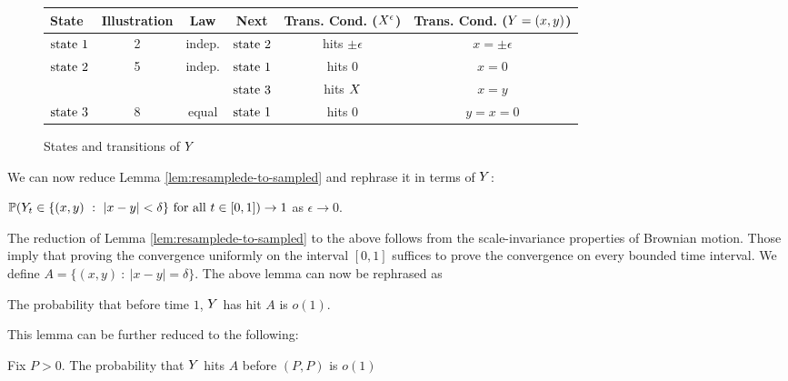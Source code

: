 {\begin{figure}\label{fig:twodimtranstab}
\begin{center}
  \begin{tabular}{| l || c | c | c | c | c | }
    \hline
    State & Illustration & Law & Next & Trans. Cond. ($X^{\epsilon}$) & Trans. Cond. ($Y=(x,y)$) \\
    \hline
    \hline
    $\text{state }1$ & 2 & indep. & $\text{state }2$ & hits $\pm\epsilon$ & $x=\pm\epsilon$ \\
    \hline
    \multirow{2}{*}{$\text{state }2$} & \multirow{2}{*}{5} & \multirow{2}{*}{indep.} & $\text{state }1$ & hits $0$ & $x=0$ \\ \cline{4-6}
        &  &  & $\text{state }3$ & hits $X$ & $x=y$\\
    \hline
    $\text{state }3$  & 8 & equal & $\text{state }1$ &  hits $0$ & $y=x=0$\\
    \hline
  \end{tabular}
\end{center}
\caption{States and transitions of $Y$}
\end{figure}

We can now reduce Lemma \ref{lem:resamplede-to-sampled} and rephrase it in terms of $Y$:
\begin{lemma*}
$\P(\twodim_t \in \{(x,y) \ :\  |x-y|<\delta \} \text{ for all } t \in [0,1])\to1$ as $\epsilon\to 0$.
\end{lemma*}
The reduction of Lemma \ref{lem:resamplede-to-sampled} to the above
follows from the scale-invariance properties of Brownian motion. Those
imply that proving the convergence uniformly on the interval $[0,1]$
suffices to prove the convergence on every bounded time interval.
\newcommand{\boundarylines}{A}
We define $\boundarylines=\{(x,y) \ :\  |x-y|=\delta \}$.
The above lemma can now be rephrased as
\begin{lemma*}
  The probability that before time $1$, $Y$ has hit $\boundarylines$
  is $o(1)$.
\end{lemma*}

This lemma can be further reduced to the following:
\newcommand{\farpoint}{(P,P)}
\newcommand{\probhitboundaryis}[1]{Fix $P > 0$.  The probability that $\twodim$
  hits $\boundarylines$ before $\farpoint$ is #1}

\begin{lemma}\label{lem:prob-hit-boundary-o1}
  \probhitboundaryis{$o(1)$}
\end{lemma}

}
